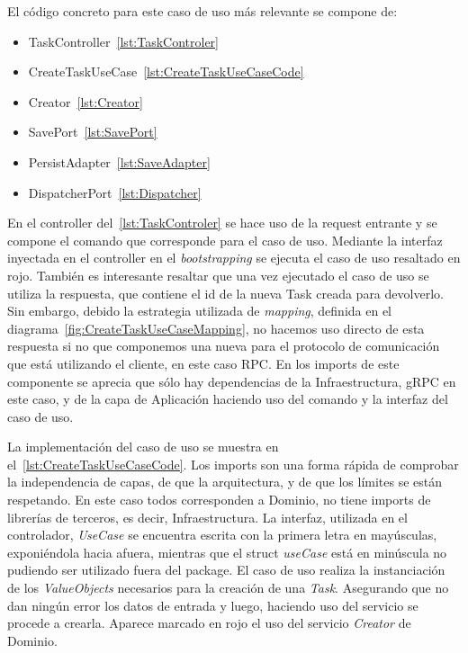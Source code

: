 El código concreto para este caso de uso más relevante se compone de:
\begin{itemize}
    \item TaskController~\cref{lst:TaskControler}
    \item CreateTaskUseCase~\cref{lst:CreateTaskUseCaseCode}
    \item Creator~\cref{lst:Creator}
    \item SavePort~\cref{lst:SavePort}
    \item PersistAdapter~\cref{lst:SaveAdapter}
    \item DispatcherPort~\cref{lst:Dispatcher}
\end{itemize}

En el controller del~\cref{lst:TaskControler} se hace uso de la request entrante y se compone el comando que corresponde para el caso de uso.
Mediante la interfaz inyectada en el controller en el \textit{bootstrapping} se ejecuta el caso de uso resaltado en rojo.
También es interesante resaltar que una vez ejecutado el caso de uso se utiliza la respuesta, que contiene el id de la nueva Task creada para devolverlo.
Sin embargo, debido la estrategia utilizada de \textit{mapping}, definida en el diagrama~\cref{fig:CreateTaskUseCaseMapping}, no hacemos uso directo de esta respuesta si no que componemos una nueva para el protocolo de comunicación que está utilizando el cliente, en este caso RPC.
En los imports de este componente se aprecia que sólo hay dependencias de la Infraestructura, gRPC en este caso, y de la capa de Aplicación haciendo uso del comando y la interfaz del caso de uso.

La implementación del caso de uso se muestra en el~\cref{lst:CreateTaskUseCaseCode}.
Los imports son una forma rápida de comprobar la independencia de capas, de que la arquitectura, y de que los límites se están respetando.
En este caso todos corresponden a Dominio, no tiene imports de librerías de terceros, es decir, Infraestructura.
La interfaz, utilizada en el controlador, \textit{UseCase} se encuentra escrita con la primera letra en mayúsculas, exponiéndola hacia afuera, mientras que el struct \textit{useCase} está en minúscula no pudiendo ser utilizado fuera del package.
El caso de uso realiza la instanciación de los \textit{ValueObjects} necesarios para la creación de una \textit{Task}.
Asegurando que no dan ningún error los datos de entrada y luego, haciendo uso del servicio se procede a crearla.
Aparece marcado en rojo el uso del servicio \textit{Creator} de Dominio.

